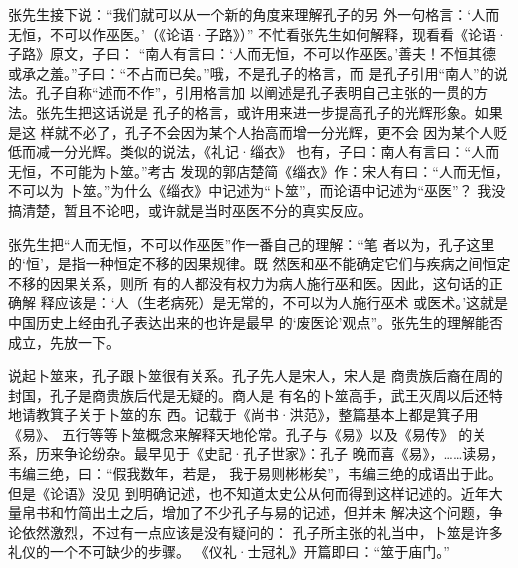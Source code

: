 张先生接下说：“我们就可以从一个新的角度来理解孔子的另
外一句格言：‘人而无恒，不可以作巫医。’（《论语·子路》）”
不忙看张先生如何解释，现看看《论语·子路》原文，子曰：
“南人有言曰：‘人而无恒，不可以作巫医。’善夫！不恒其德
或承之羞。”子曰：“不占而已矣。”哦，不是孔子的格言，而
是孔子引用“南人”的说法。孔子自称“述而不作”，引用格言加
以阐述是孔子表明自己主张的一贯的方法。张先生把这话说是
孔子的格言，或许用来进一步提高孔子的光辉形象。如果是这
样就不必了，孔子不会因为某个人抬高而增一分光辉，更不会
因为某个人贬低而减一分光辉。类似的说法，《礼记·缁衣》
也有，子曰：南人有言曰：“人而无恒，不可能为卜筮。”考古
发现的郭店楚简《缁衣》作：宋人有曰：“人而无恒，不可以为
卜筮。”为什么《缁衣》中记述为“卜筮”，而论语中记述为“巫医”？
我没搞清楚，暂且不论吧，或许就是当时巫医不分的真实反应。

张先生把“人而无恒，不可以作巫医”作一番自己的理解：“笔
者以为，孔子这里的‘恒’，是指一种恒定不移的因果规律。既
然医和巫不能确定它们与疾病之间恒定不移的因果关系，则所
有的人都没有权力为病人施行巫和医。因此，这句话的正确解
释应该是：‘人（生老病死）是无常的，不可以为人施行巫术
或医术。’这就是中国历史上经由孔子表达出来的也许是最早
的‘废医论’观点”。张先生的理解能否成立，先放一下。

说起卜筮来，孔子跟卜筮很有关系。孔子先人是宋人，宋人是
商贵族后裔在周的封国，孔子是商贵族后代是无疑的。商人是
有名的卜筮高手，武王灭周以后还特地请教箕子关于卜筮的东
西。记载于《尚书·洪范》，整篇基本上都是箕子用《易》、
五行等等卜筮概念来解释天地伦常。孔子与《易》以及《易传》
的关系，历来争论纷杂。最早见于《史記·孔子世家》：孔子
晚而喜《易》，……读易，韦编三绝，曰：“假我数年，若是，
我于易则彬彬矣”，韦编三绝的成语出于此。但是《论语》没见
到明确记述，也不知道太史公从何而得到这样记述的。近年大
量帛书和竹简出土之后，增加了不少孔子与易的记述，但并未
解决这个问题，争论依然激烈，不过有一点应该是没有疑问的：
孔子所主张的礼当中，卜筮是许多礼仪的一个不可缺少的步骤。
《仪礼·士冠礼》开篇即曰：“筮于庙门。”

